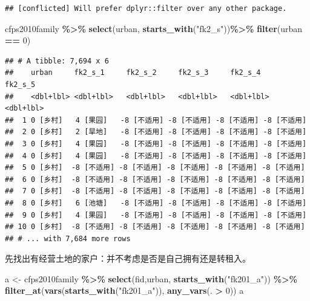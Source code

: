 \documentclass[
]{book}
\newenvironment{Shaded}{\begin{snugshade}}{\end{snugshade}}
\newcommand{\DecValTok}[1]{\textcolor[rgb]{0.00,0.00,0.81}{#1}}
\newcommand{\FunctionTok}[1]{\textcolor[rgb]{0.13,0.29,0.53}{\textbf{#1}}}
\newcommand{\NormalTok}[1]{#1}
\newcommand{\OtherTok}[1]{\textcolor[rgb]{0.56,0.35,0.01}{#1}}
\newcommand{\SpecialCharTok}[1]{\textcolor[rgb]{0.81,0.36,0.00}{\textbf{#1}}}
\newcommand{\StringTok}[1]{\textcolor[rgb]{0.31,0.60,0.02}{#1}}
\begin{document}
\begin{verbatim}
## [conflicted] Will prefer dplyr::filter over any other package.
\end{verbatim}

\begin{Shaded}
\begin{Highlighting}[]
\NormalTok{cfps2010family }\SpecialCharTok{\%\textgreater{}\%}
  \FunctionTok{select}\NormalTok{(urban, }\FunctionTok{starts\_with}\NormalTok{(}\StringTok{"fk2\_s"}\NormalTok{))}\SpecialCharTok{\%\textgreater{}\%}
  \FunctionTok{filter}\NormalTok{(urban }\SpecialCharTok{==} \DecValTok{0}\NormalTok{)}
\end{Highlighting}
\end{Shaded}

\begin{verbatim}
## # A tibble: 7,694 x 6
##    urban     fk2_s_1     fk2_s_2     fk2_s_3     fk2_s_4     fk2_s_5    
##    <dbl+lbl> <dbl+lbl>   <dbl+lbl>   <dbl+lbl>   <dbl+lbl>   <dbl+lbl>  
##  1 0 [乡村]   4 [果园]   -8 [不适用] -8 [不适用] -8 [不适用] -8 [不适用]
##  2 0 [乡村]   2 [旱地]   -8 [不适用] -8 [不适用] -8 [不适用] -8 [不适用]
##  3 0 [乡村]   4 [果园]   -8 [不适用] -8 [不适用] -8 [不适用] -8 [不适用]
##  4 0 [乡村]   4 [果园]   -8 [不适用] -8 [不适用] -8 [不适用] -8 [不适用]
##  5 0 [乡村]  -8 [不适用] -8 [不适用] -8 [不适用] -8 [不适用] -8 [不适用]
##  6 0 [乡村]  -8 [不适用] -8 [不适用] -8 [不适用] -8 [不适用] -8 [不适用]
##  7 0 [乡村]  -8 [不适用] -8 [不适用] -8 [不适用] -8 [不适用] -8 [不适用]
##  8 0 [乡村]   6 [池塘]   -8 [不适用] -8 [不适用] -8 [不适用] -8 [不适用]
##  9 0 [乡村]   4 [果园]   -8 [不适用] -8 [不适用] -8 [不适用] -8 [不适用]
## 10 0 [乡村]  -8 [不适用] -8 [不适用] -8 [不适用] -8 [不适用] -8 [不适用]
## # ... with 7,684 more rows
\end{verbatim}

先找出有经营土地的家户：并不考虑是否是自己拥有还是转租入。

\begin{Shaded}
\begin{Highlighting}[]
\NormalTok{a }\OtherTok{\textless{}{-}}\NormalTok{ cfps2010family }\SpecialCharTok{\%\textgreater{}\%}
  \FunctionTok{select}\NormalTok{(fid,urban, }\FunctionTok{starts\_with}\NormalTok{(}\StringTok{"fk201\_a"}\NormalTok{)) }\SpecialCharTok{\%\textgreater{}\%}
  \FunctionTok{filter\_at}\NormalTok{(}\FunctionTok{vars}\NormalTok{(}\FunctionTok{starts\_with}\NormalTok{(}\StringTok{"fk201\_a"}\NormalTok{)), }\FunctionTok{any\_vars}\NormalTok{(. }\SpecialCharTok{\textgreater{}} \DecValTok{0}\NormalTok{))}
\NormalTok{a}
\end{Highlighting}
\end{Shaded}
\end{document}
